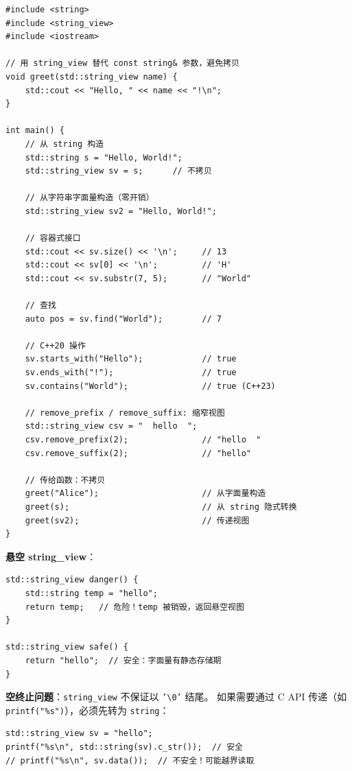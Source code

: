 \documentclass[12pt,a4paper,fontset=fandol]{ctexbook}
\begin{document}
\begin{lstlisting}
#include <string>
#include <string_view>
#include <iostream>

// 用 string_view 替代 const string& 参数，避免拷贝
void greet(std::string_view name) {
    std::cout << "Hello, " << name << "!\n";
}

int main() {
    // 从 string 构造
    std::string s = "Hello, World!";
    std::string_view sv = s;      // 不拷贝

    // 从字符串字面量构造（零开销）
    std::string_view sv2 = "Hello, World!";

    // 容器式接口
    std::cout << sv.size() << '\n';     // 13
    std::cout << sv[0] << '\n';         // 'H'
    std::cout << sv.substr(7, 5);       // "World"

    // 查找
    auto pos = sv.find("World");        // 7

    // C++20 操作
    sv.starts_with("Hello");            // true
    sv.ends_with("!");                  // true
    sv.contains("World");               // true (C++23)

    // remove_prefix / remove_suffix: 缩窄视图
    std::string_view csv = "  hello  ";
    csv.remove_prefix(2);               // "hello  "
    csv.remove_suffix(2);               // "hello"

    // 传给函数：不拷贝
    greet("Alice");                     // 从字面量构造
    greet(s);                           // 从 string 隐式转换
    greet(sv2);                         // 传递视图
}
\end{lstlisting}

\begin{warning}
\textbf{悬空 string\_view}：
\begin{lstlisting}
std::string_view danger() {
    std::string temp = "hello";
    return temp;   // 危险！temp 被销毁，返回悬空视图
}

std::string_view safe() {
    return "hello";  // 安全：字面量有静态存储期
}
\end{lstlisting}
\end{warning}

\begin{warning}
\textbf{空终止问题}：\texttt{string\_view} 不保证以 \texttt{'\textbackslash 0'} 结尾。
如果需要通过 C API 传递（如 \texttt{printf("\%s")}），必须先转为 \texttt{string}：
\begin{lstlisting}
std::string_view sv = "hello";
printf("%s\n", std::string(sv).c_str());  // 安全
// printf("%s\n", sv.data());  // 不安全！可能越界读取
\end{lstlisting}
\end{warning}
\end{document}
